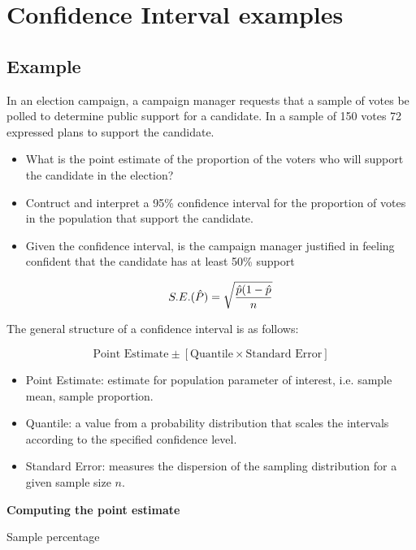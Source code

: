 \documentclass[]{report}
\begin{document}
\section{Confidence Interval examples}


\subsection{Example}
In an election campaign, a campaign manager requests that a sample of votes be polled to determine public support for a candidate. In a sample of 150 votes 72 expressed plans to support the candidate.



\begin{itemize}
	\item What is the point estimate of the proportion of the voters who will support the candidate in the election?
	\item Contruct and interpret a 95\% confidence interval for the proportion of votes in the population that support the candidate.
	
	\item Given the confidence interval, is the campaign manager justified in feeling confident that the candidate has at least 50\% support
	
	\[S.E. (\hat{P}) = \sqrt{{\hat{p}(1-\hat{p} \over n}}\]
\end{itemize}


\begin{framed}
The general structure of a confidence interval is as follows:

\[ \mbox{Point Estimate}  \pm \left[ \mbox{Quantile} \times \mbox{Standard Error} \right] \]


\begin{itemize}
\item Point Estimate: estimate for population parameter of interest, i.e. sample mean, sample proportion.
\item Quantile: a value from a probability distribution that scales the intervals according to the specified confidence level.
\item Standard Error: measures the dispersion of the sampling distribution for a given sample size $n$.
\end{itemize}
\end{framed}

\textbf{Computing the point estimate}

Sample percentage
\end{document}
